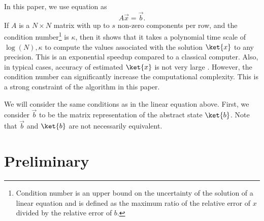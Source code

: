 \documentclass[b5paper,papersize,dvipdfmx,fleqn]{article}
\begin{document}

In this paper, we use equation as
$$
A\vec{x} = \vec{b}.
$$
If $A$ is a $N\times N$ matrix with up to $s$ non-zero components per row, and the condition number\footnote{Condition number is an upper bound on the uncertainty of the solution of a linear equation and is defined as the maximum ratio of the relative error of $x$ divided by the relative error of $b$.} is $\kappa $, then it shows that it takes a polynomial time scale of $\log(N),\kappa $ to compute the values associated with the solution $\ket{x}$ to any precision. This is an exponential speedup compared to a classical computer. Also, in typical cases, accuracy of estimated $\ket{x}$ is not very large \cite{Harrow2009}. However, the condition number can significantly increase the computational complexity. This is a strong constraint of the algorithm in this paper.

We will consider the same conditions as in the linear equation above. First, we consider $\vec{b}$ to be the matrix representation of the abstract state $\ket{b}$. Note that $\vec{b}$ and $\ket{b}$ are not necessarily equivalent.

%

%

\section{Preliminary}
\end{document}

